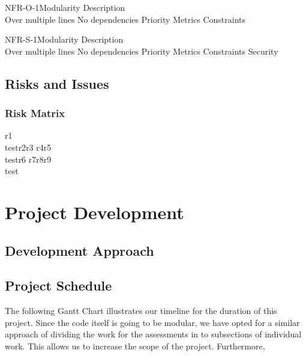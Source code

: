 \documentclass[coverpage,lineno]{../custom}
\begin{document}
\NonFunctionalReq
{NFR-O-1}{Modularity}
{Description\\Over multiple lines}
{No dependencies}
{Priority}
{Metrics}
{Constraints}

\NonFunctionalReqS
{NFR-S-1}{Modularity}
{Description\\Over multiple lines}
{No dependencies}
{Priority}
{Metrics}
{Constraints}
{Security}

\subsection{Risks and Issues}
\label{ssec:risks}

\subsubsection{Risk Matrix}

\RiskMatrix
{r1\\test}{r2}{r3}
{r4}{r5\\test}{r6}
{r7}{r8}{r9\\test}

\section{Project Development}
\label{sec:dev}

\subsection{Development Approach}
\label{ssec:dev_approach}

\subsection{Project Schedule}
\label{ssec:schedule}

The following Gantt Chart illustrates our timeline for the duration of this project. Since the code itself is going to be modular, we have opted for a similar approach of dividing the work for the assessments in to subsections of individual work. This allows us to increase the scope of the project. Furthermore,    
\end{document}
